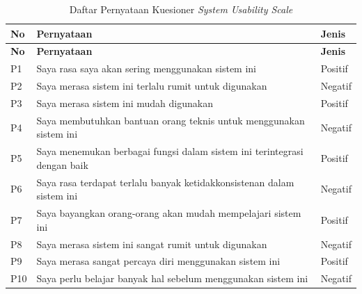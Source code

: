\begin{longtable}{|T{0.05\textwidth}|L{0.60\textwidth}|T{0.14\textwidth}|}
	\caption{Daftar Pernyataan Kuesioner \textit{System Usability Scale}}
	\label{table:4.sus_items}\\
	\hline
	\textbf{No} & \textbf{Pernyataan} & \textbf{Jenis} \\
	\hline
	\endfirsthead
	\hline
	\textbf{No} & \textbf{Pernyataan} & \textbf{Jenis} \\
	\hline
	\endhead
	P1 & Saya rasa saya akan sering menggunakan sistem ini & Positif \\
	\hline
	P2 & Saya merasa sistem ini terlalu rumit untuk digunakan & Negatif \\
	\hline
	P3 & Saya merasa sistem ini mudah digunakan & Positif \\
	\hline
	P4 & Saya membutuhkan bantuan orang teknis untuk menggunakan sistem ini & Negatif \\
	\hline
	P5 & Saya menemukan berbagai fungsi dalam sistem ini terintegrasi dengan baik & Positif \\
	\hline
	P6 & Saya rasa terdapat terlalu banyak ketidakkonsistenan dalam sistem ini & Negatif \\
	\hline
	P7 & Saya bayangkan orang-orang akan mudah mempelajari sistem ini & Positif \\
	\hline
	P8 & Saya merasa sistem ini sangat rumit untuk digunakan & Negatif \\
	\hline
	P9 & Saya merasa sangat percaya diri menggunakan sistem ini & Positif \\
	\hline
	P10 & Saya perlu belajar banyak hal sebelum menggunakan sistem ini & Negatif \\
	\hline
\end{longtable}

